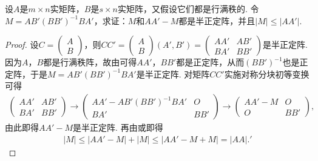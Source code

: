 \documentclass[../../main.tex]{subfiles}%
\begin{document}
\begin{example}\label{example:例9.81}
设\(A\)是\(m\times n\)实矩阵，\(B\)是\(s\times n\)实矩阵，又假设它们都是行满秩的. 令\(M = AB'(BB')^{-1}BA'\)，求证：\(M\)和\(AA' - M\)都是半正定阵，并且\(\vert M\vert\leqslant \vert AA'\vert\).
\end{example}
\begin{proof}
设\(C=\begin{pmatrix}A\\B\end{pmatrix}\)，则\(CC'=\begin{pmatrix}A\\B\end{pmatrix}(A',B')=\begin{pmatrix}AA'&AB'\\BA'&BB'\end{pmatrix}\)是半正定阵. 因为\(A\)，\(B\)都是行满秩阵，故由可得\(AA'\)，\(BB'\)都是正定阵，从而\((BB')^{-1}\)也是正定阵，于是\(M = AB'(BB')^{-1}BA'\)是半正定阵. 对矩阵\(CC'\)实施对称分块初等变换可得
\begin{align*}
\begin{pmatrix}AA'&AB'\\BA'&BB'\end{pmatrix}\to\begin{pmatrix}AA' - AB'(BB')^{-1}BA'&O\\BA'&BB'\end{pmatrix}\to\begin{pmatrix}AA' - M&O\\O&BB'\end{pmatrix},
\end{align*}
由此即得\(AA' - M\)是半正定阵. 再由或即得
\begin{align*}
\left| M \right|\leqslant \left| AA' -M \right|+\left| M \right|\leqslant \left| AA'-M+M \right|=\left| AA\right|.
'\end{align*}
\end{proof}
\end{document}
